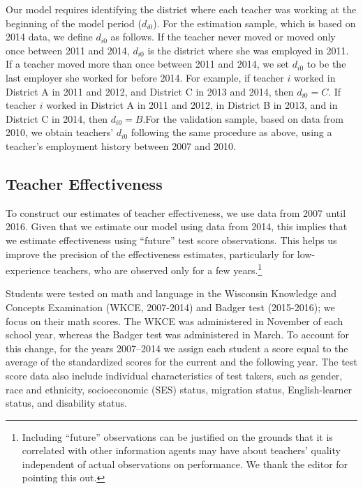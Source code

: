\documentclass[notitlepage,12pt]{article}%
\begin{document}
Our model requires identifying the district where each teacher was working at
the beginning of the model period ($d_{i0}$). For the estimation sample, which
is based on 2014 data, we define $d_{i0}$ as follows. If the teacher never
moved or moved only once between 2011 and 2014, $d_{i0}$ is the district where
she was employed in 2011. If a teacher moved more than once between 2011 and
2014, we set $d_{i0}$ to be the last employer she worked for before 2014. For
example, if teacher $i$ worked in District A in 2011 and 2012, and District C
in 2013 and 2014, then $d_{i0}=C$. If teacher $i$ worked in District A in 2011
and 2012, in District B in 2013, and in District C in 2014, then $d_{i0}%
=B$.\newline For the validation sample, based on data from 2010, we obtain
teachers' $d_{i0}$ following the same procedure as above, using a teacher's
employment history between 2007 and 2010.

\subsection{Teacher Effectiveness}

To construct our estimates of teacher effectiveness, we use data from 2007 until 2016. Given that we estimate our model using data from 2014, this implies that we estimate effectiveness using ``future'' test score observations. This helps us improve the precision of the effectiveness estimates, particularly for low-experience teachers, who are observed only for a few years.\footnote{Including ``future” observations can be justified on the grounds that it is correlated with other information agents may have about teachers' quality independent of actual observations on performance. We thank the editor for pointing this out.}

Students were tested on math and language in the Wisconsin Knowledge and
Concepts Examination (WKCE, 2007-2014) and Badger test (2015-2016); we focus
on their math scores. The WKCE was administered in November of each school
year, whereas the Badger test was administered in March. To account for this
change, for the years 2007--2014 we assign each student a score equal to the
average of the standardized scores for the current and the following year. The
test score data also include individual characteristics of test takers, such
as gender, race and ethnicity, socioeconomic (SES) status, migration status,
English-learner status, and disability status. 
\end{document}
